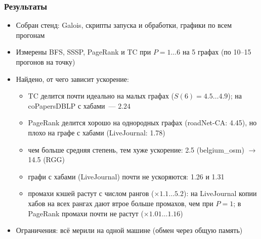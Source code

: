 \documentclass
  [ russian
  , aspectratio=1610
  ] {beamer}
\begin{document}
\begin{frame}
    \frametitle{Результаты}
    \begin{itemize}
        \item Собран стенд: Galois, скрипты запуска и обработки, графики по всем прогонам
        \item Измерены BFS, SSSP, PageRank и TC при $P = 1\ldots6$ на 5 графах
              (по 10--15 прогонов на точку)
        \item Найдено, от чего зависит ускорение:
              \begin{itemize}
                  \item TC делится почти идеально на малых графах ($S(6) = 4.5\ldots4.9$);
                        на coPapersDBLP с хабами~--- $2.24$
                  \item PageRank делится хорошо на однородных графах (roadNet-CA: 4.45),
                        но плохо на графе с хабами (LiveJournal: 1.78)
                  \item чем больше средняя степень, тем хуже ускорение:
                        2.5 (belgium\_osm) $\to$ 14.5 (RGG)
                  \item графи с хабами (LiveJournal) почти не ускоряются: 1.26 и 1.31
                  \item промахи кэшей растут с числом рангов ($\times 1.1\ldots5.2$):
                        на LiveJournal копии хабов на всех рангах дают
                        втрое больше промахов, чем при $P = 1$;
                        в PageRank промахи почти не растут ($\times 1.01\ldots1.16$)
              \end{itemize}
        \item Ограничения: всё мерили на одной машине (обмен через общую память)
    \end{itemize}
\end{frame}
\end{document}
